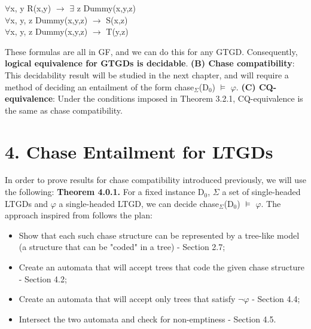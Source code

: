 \documentclass[11pt, a4paper, dvipsnames]{article}
\begin{document}
\begin{center}
$\forall$x, y R(x,y) $\rightarrow$ $\exists$ z Dummy(x,y,z)\\
$\forall$x, y, z Dummy(x,y,z) $\rightarrow$ S(x,z)\\
$\forall$x, y, z Dummy(x,y,z) $\rightarrow$ T(y,z)
\end{center}
These formulas are all in GF, and we can do this for any GTGD.\newline
Consequently, \textbf{logical equivalence for GTGDs is decidable}. \newline
\textbf{(B) Chase compatibility}:
This decidability result will be studied in the next chapter, and will require a method of deciding an entailment of the form chase$_{\Sigma}$(D$_{0}$) $\vDash$ $\varphi$.\newline
\textbf{(C) CQ-equivalence}: Under the conditions imposed in Theorem 3.2.1, CQ-equivalence is the same as chase compatibility.  

\newpage

\section{4. Chase Entailment for LTGDs}
In order to prove results for chase compatibility introduced previously, we will use the following:\newline
\textbf{Theorem 4.0.1.} For a fixed instance D$_{0}$, $\Sigma$ a set of single-headed LTGDs and $\varphi$ a single-headed LTGD, we can decide chase$_{\Sigma}$(D$_{0}$) $\vDash$ $\varphi$. \newline
The approach inspired from \cite{decidable} follows the plan:
\begin{itemize}
	\item Show that each such chase structure can be represented by a tree-like model (a structure that can be "coded" in a tree) - Section 2.7;
	\item Create an automata that will accept trees that code the given chase structure - Section 4.2;
	\item Create an automata that will accept only trees that satisfy $\neg \varphi$ - Section 4.4;
	\item Intersect the two automata and check for non-emptiness - Section 4.5.
\end{itemize}
\end{document}
